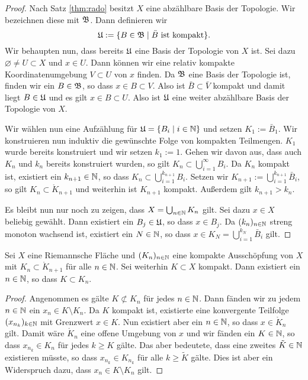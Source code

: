 \begin{proof}
  Nach Satz \ref{thm:rado} besitzt $X$ eine abzählbare Basis der
  Topologie. Wir bezeichnen diese mit $\mathfrak{B}$. Dann definieren wir
  \[
  \mathfrak{U} := \{ B \in \mathfrak{B} \mid \bar B \text{ ist kompakt}\}.
  \]
  Wir behaupten nun, dass bereits $\mathfrak{U}$ eine Basis der Topologie von
  $X$ ist. Sei dazu $\varnothing \neq U \subset X$ und $x \in U$. Dann
  können wir eine relativ kompakte Koordinatenumgebung $V \subset U$
  von $x$ finden. Da $\mathfrak{B}$ eine Basis der Topologie ist, finden wir
  ein $B \in \mathfrak{B}$, so dass $x \in B \subset V$. Also ist $\bar B
  \subset \bar V$ kompakt und damit liegt $B \in \mathfrak{U}$ und es gilt $x
  \in B \subset U$. Also ist $\mathfrak{U}$ eine weiter abzählbare Basis der
  Topologie von $X$.

  Wir wählen nun eine Aufzählung für $\mathfrak{U} = \{B_i \mid i \in \mathbb{N}\}$ und
  setzen $K_1 := \bar B_1$. Wir konstruieren nun induktiv die
  gewünschte Folge von kompakten Teilmengen. $K_1$ wurde bereits
  konstruiert und wir setzen $k_1 := 1$. Gehen wir davon aus, dass auch
  $K_n$ und $k_n$ bereits
  konstruiert wurden, so gilt $K_n \subset \bigcup_{i=1}^\infty
  B_i$. Da $K_n$ kompakt ist, existiert ein $k_{n+1} \in \mathbb{N}$, so dass $K_n
  \subset \bigcup_{i=1}^{k_{n+1}} B_i$. Setzen wir $K_{n+1} :=
  \bigcup_{i=1}^{k_{n+1}}\bar B_i$, so gilt $K_n \subset \mathring
  K_{n+1}$ und weiterhin ist $K_{n+1}$ kompakt. Außerdem gilt
  $k_{n+1} > k_n$.

  Es bleibt nun nur noch zu zeigen, dass $X = \bigcup_{n \in \mathbb{N}} K_n$
  gilt. Sei dazu $x \in X$ beliebig gewählt. Dann existiert ein $B_j \in
  \mathfrak{U}$, so dass $x \in B_j$. Da $(k_n)_{n \in\mathbb{N}}$ streng monoton
  wachsend ist, existiert ein $N \in \mathbb{N}$, so dass $x \in K_N =
  \bigcup_{i=1}^{k_N} \bar B_i$ gilt.
\end{proof}

\begin{lemma}
  \label{lemma:kompakt-in-ausschöpfung}
  Sei $X$ eine Riemannsche Fläche und $(K_n)_{n \in \mathbb{N}}$ eine kompakte
  Ausschöpfung von $X$ mit $K_n \subset \mathring K_{n+1}$ für alle $n
  \in \mathbb{N}$. Sei weiterhin $K \subset X$ kompakt. Dann existiert ein $n
  \in \mathbb{N}$, so dass $K \subset K_n$.
\end{lemma}

\begin{proof}
  Angenommen es gälte $K \not \subset K_n$ für jedes $n \in \mathbb{N}$. Dann
  fänden wir zu jedem $n \in \mathbb{N}$ ein $x_n \in K\setminus K_n$. Da $K$
  kompakt ist, existierte eine konvergente Teilfolge $(x_{n_k})_{k\in
    \mathbb{N}}$ mit Grenzwert $x \in K$. Nun existiert aber ein $n \in \mathbb{N}$,
  so dass $x \in \mathring K_n$ gilt. Damit wäre $\mathring K_n$ eine offene
  Umgebung von $x$ und wir fänden ein $K \in \mathbb{N}$, so dass $x_{n_k} \in
  K_n$ für jedes $k\geq K$ gälte. Das aber bedeutete, dass eine
  zweites $\tilde K \in \mathbb{N}$ existieren müsste, so dass $x_{n_k} \in K_{n_k}$
  für alle $k \geq \tilde K$ gälte. Dies ist aber ein Widerspruch dazu,
  dass $x_n \in K \setminus K_n$ gilt.
\end{proof}


